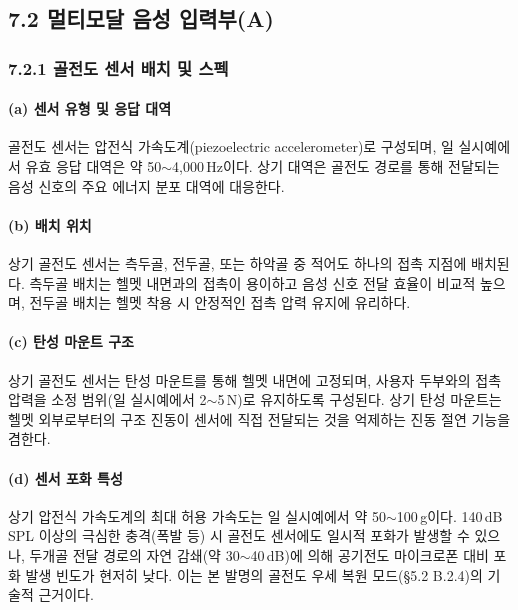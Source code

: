 \documentclass{article}
\begin{document}
\subsection{7.2 멀티모달 음성 입력부(A)}

\subsubsection{7.2.1 골전도 센서 배치 및 스펙}

\paragraph{(a) 센서 유형 및 응답 대역}

골전도 센서는 압전식 가속도계(piezoelectric accelerometer)로 구성되며, 일 실시예에서 유효 응답 대역은 약 50$\sim$4{,}000\,Hz이다. 상기 대역은 골전도 경로를 통해 전달되는 음성 신호의 주요 에너지 분포 대역에 대응한다.

\paragraph{(b) 배치 위치}

상기 골전도 센서는 측두골, 전두골, 또는 하악골 중 적어도 하나의 접촉 지점에 배치된다. 측두골 배치는 헬멧 내면과의 접촉이 용이하고 음성 신호 전달 효율이 비교적 높으며, 전두골 배치는 헬멧 착용 시 안정적인 접촉 압력 유지에 유리하다.

\paragraph{(c) 탄성 마운트 구조}

상기 골전도 센서는 탄성 마운트를 통해 헬멧 내면에 고정되며, 사용자 두부와의 접촉 압력을 소정 범위(일 실시예에서 2$\sim$5\,N)로 유지하도록 구성된다. 상기 탄성 마운트는 헬멧 외부로부터의 구조 진동이 센서에 직접 전달되는 것을 억제하는 진동 절연 기능을 겸한다.

\paragraph{(d) 센서 포화 특성}

상기 압전식 가속도계의 최대 허용 가속도는 일 실시예에서 약 50$\sim$100\,g이다. 140\,dB\,SPL 이상의 극심한 충격(폭발 등) 시 골전도 센서에도 일시적 포화가 발생할 수 있으나, 두개골 전달 경로의 자연 감쇄(약 30$\sim$40\,dB)에 의해 공기전도 마이크로폰 대비 포화 발생 빈도가 현저히 낮다. 이는 본 발명의 골전도 우세 복원 모드(§5.2 B.2.4)의 기술적 근거이다.
\end{document}
